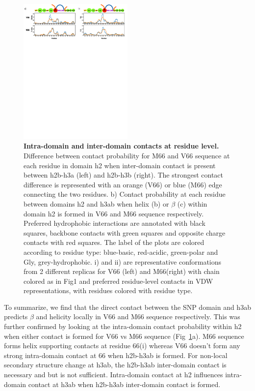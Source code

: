 \documentclass[journal=jacsat,manuscript=article]{achemso}
\begin{document}
\begin{figure}[!ht]
\includegraphics[scale=0.5,width=0.5\textwidth,trim={0 0cm 0 0cm},clip]{../figures/fig6.pdf}
\caption{{\bf Intra-domain and inter-domain contacts at residue level.} Difference between contact probability for M66 and V66 sequence at each residue in domain h2 when inter-domain contact is present between h2b-h3a (left) and h2b-h3b (right). The strongest contact difference is represented with an orange (V66) or blue (M66) edge connecting the two residues. b) Contact probability at each residue between domains h2 and h3ab when helix (b) or $\beta$ (c) within domain h2 is formed in V66 and M66 sequence respectively. Preferred hydrophobic interactions are annotated with black squares, backbone contacts with green squares and opposite charge contacts with red squares. The label of the plots are colored according to residue type: blue-basic, red-acidic, green-polar and Gly, grey-hydrophobic. i) and ii) are representative conformations from 2 different replicas for V66 (left) and M66(right) with chain colored as in Fig1 and preferred residue-level contacts in VDW representations, with residues colored with residue type.}
\label{fig6}
\end{figure}

To summarize, we find that the direct contact between the SNP domain and h3ab predicts $\beta$ and helicity locally in V66 and M66 sequence respectively. This was further confirmed by looking at the intra-domain contact probability within h2 when either contact is formed for V66 vs M66 sequence (Fig~\ref{fig6}a). M66 sequence forms helix supporting contacts at residue 66(i) whereas V66 doesn't form any strong intra-domain contact at 66 when h2b-h3ab is formed.
For non-local secondary structure change at h3ab, the h2b-h3ab inter-domain contact is necessary and but is not sufficient. Intra-domain contact at h2 influences intra-domain contact at h3ab when h2b-h3ab inter-domain contact is formed.
\end{document}
